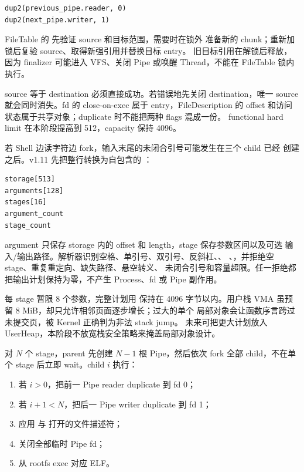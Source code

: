 \begin{verbatim}
dup2(previous_pipe.reader, 0)
dup2(next_pipe.writer, 1)
\end{verbatim}

FileTable 的  先验证 source 和目标范围，需要时在锁外
准备新的 chunk；重新加锁后复验 source、取得新强引用并替换目标 entry。
旧目标引用在解锁后释放，因为 finalizer 可能进入 VFS、关闭 Pipe 或唤醒
Thread，不能在 FileTable 锁内执行。

source 等于 destination 必须直接成功。若错误地先关闭 destination，唯一
source 就会同时消失。fd 的 close-on-exec 属于 entry，FileDescription 的
offset 和访问状态属于共享对象；duplicate 时不能把两种 flags 混成一份。
functional hard limit 在本阶段提高到 512，capacity 保持 4096。

若 Shell 边读字符边 fork，输入末尾的未闭合引号可能发生在三个 child 已经
创建之后。v1.11 先把整行转换为自包含的
：

\begin{verbatim}
storage[513]
arguments[128]
stages[16]
argument_count
stage_count
\end{verbatim}

argument 只保存 storage 内的 offset 和 length，stage 保存参数区间以及可选
输入/输出路径。解析器识别空格、单引号、双引号、反斜杠、\code{|}、
\code{<}、\code{>}，并拒绝空 stage、重复重定向、缺失路径、悬空转义、
未闭合引号和容量超限。任一拒绝都把输出计划保持为零，不产生 Process、fd
或 Pipe 副作用。

每 stage 暂限 8 个参数，完整计划用  保持在 4096
字节以内。用户栈 VMA 虽预留 8 MiB，却只允许相邻页面逐步增长；过大的单个
局部对象会让函数序言跨过未提交页，被 Kernel 正确判为非法 stack jump。
未来可把更大计划放入 UserHeap，本阶段不放宽栈安全策略来掩盖局部对象设计。

对 \(N\) 个 stage，parent 先创建 \(N-1\) 根 Pipe，然后依次 fork 全部
child，不在单个 stage 后立即 wait。child \(i\) 执行：

\begin{enumerate}[label=\arabic*.]
  \item 若 \(i>0\)，把前一 Pipe reader duplicate 到 fd 0；
  \item 若 \(i+1<N\)，把后一 Pipe writer duplicate 到 fd 1；
  \item 应用 \code{<} 与 \code{>} 打开的文件描述符；
  \item 关闭全部临时 Pipe fd；
  \item 从 rootfs exec 对应  ELF。
\end{enumerate}

